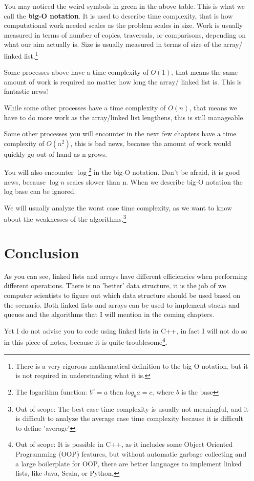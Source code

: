 You may noticed the weird symbols in green in the above table. This is what we call the \textbf{big-O notation}. It is used to describe time complexity, that is how computational work needed scales as the problem scales in size. Work is usually measured in terms of number of copies, traversals, or comparisons, depending on what our aim actually is. Size is usually measured in terms of size of the array/ linked list.\footnote{There is a very rigorous mathematical definition to the big-O notation, but it is not required in understanding what it is.}

Some processes above have a time complexity of $O(1)$, that means the same amount of work is required no matter how long the array/ linked list is. This is fantastic news! 

While some other processes have a time complexity of $O(n)$, that means we have to do more work as the array/linked list lengthens, this is still manageable. 

Some other processes you will encounter in the next few chapters have a time complexity of $O(n^2)$, this is bad news, because the amount of work would quickly go out of hand as n grows.

You will also encounter $\log$\footnote{The logarithm function: $b^c = a$ then $log_b a = c$, where $b$ is the base} in the big-O notation. Don't be afraid, it is good news, because $\log n$ scales slower than n. When we describe big-O notation the log base can be ignored.

We will usually analyze the worst case time complexity, as we want to know about the weaknesses of the algorithms.\footnote{Out of scope: The best case time complexity is usually not meaningful, and it is difficult to analyze the average case time complexity because it is difficult to define 'average'}

\section{Conclusion}
As you can see, linked lists and arrays have different efficiencies when performing different operations. There is no 'better' data structure, it is the job of we computer scientists to figure out which data structure should be used based on the scenario. Both linked lists and arrays can be used to implement stacks and queues and the algorithms that I will mention in the coming chapters. 

Yet I do not advise you to code using linked lists in C++, in fact I will not do so in this piece of notes, because it is quite troublesome\footnote{Out of scope: It is possible in C++, as it includes some Object Oriented Programming (OOP) features, but without automatic garbage collecting and a large boilerplate for OOP, there are better languages to implement linked lists, like Java, Scala, or Python.
}.
